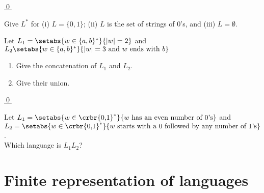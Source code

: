 \documentclass[11pt]{article}
\begin{document}
{\begin{uexercise}
\hyperlink{extf1sol}{\qed}
\end{uexercise}

\begin{uexercise}\label{write-ext} Give $L^*$ for (i) $L=\{0,1\}$;  (ii) $L$ is the set of
	strings of 0's, and (iii) $L=\emptyset$. 
\end{uexercise}

\begin{uexercise}\label{exconcuni}
Let $L_1 = \setabs{w \in \{ a,b\}^*}{|w| = 2}$ and $L_2\setabs{w \in \{ a,b\}^*}{|w| = 3 \text{ and } w \text{ ends with } b}$

\begin{enumerate}
\item\label{exconcunia} Give the concatenation of $L_1$ and $L_2$.
\item\label{exconcunib} Give their union.
\end{enumerate}

\hyperlink{exconcunisol}{\qed}
\end{uexercise}



\begin{uexercise}\label{lang-desc}
Let $L_1=\setabs{w \in \crbr{\text{0,1}}^*}{w \text{ has an even number of
0's}}$ and  \\
$L_2= \setabs{w \in \crbr{\text{0,1}}^*}{w \text{ starts
with a 0 followed by any number of 1's}}$. \\ Which language is $L_1L_2$?
\end{uexercise}
\hrulefill

}

\section{Finite representation of languages}
\end{document}
